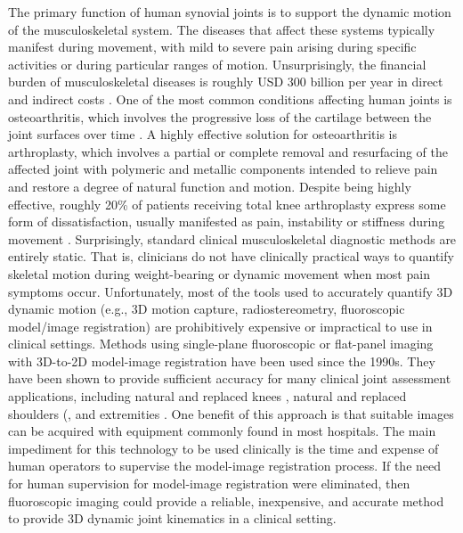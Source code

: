 The primary function of human synovial joints is to support the dynamic motion of the musculoskeletal system. The diseases that affect these systems typically manifest during movement, with mild to severe pain arising during specific activities or during particular ranges of motion. Unsurprisingly, the financial burden of musculoskeletal diseases is roughly USD 300 billion per year in direct and indirect costs \cite{BMUSBurdenMusculoskeletal}. One of the most common conditions affecting human joints is osteoarthritis, which involves the progressive loss of the cartilage between the joint surfaces over time \cite{sharmaOsteoarthritisCompanionRheumatology2007}. A highly effective solution for osteoarthritis is arthroplasty, which involves a partial or complete removal and resurfacing of the affected joint with polymeric and metallic components intended to relieve pain and restore a degree of natural function and motion. Despite being highly effective, roughly 20\% of patients receiving total knee arthroplasty express some form of dissatisfaction, usually manifested as pain, instability or stiffness during movement \cite{bakerRolePainFunction2007,scottPredictingDissatisfactionFollowing2010, bournePatientSatisfactionTotal2010}. Surprisingly, standard clinical musculoskeletal diagnostic methods are entirely static. That is, clinicians do not have clinically practical ways to quantify skeletal motion during weight-bearing or dynamic movement when most pain symptoms occur. Unfortunately, most of the tools used to accurately quantify 3D dynamic motion (e.g., 3D motion capture, radiostereometry, fluoroscopic model/image registration) are prohibitively expensive or impractical to use in clinical settings. Methods using single-plane fluoroscopic or flat-panel imaging with 3D-to-2D model-image registration have been used since the 1990s. They have been shown to provide sufficient accuracy for many clinical  joint assessment applications, including natural and replaced knees \cite{banksAccurateMeasurementThreedimensional1996, banksVivoKinematicsCruciateretaining1997, mahfouzRobustMethodRegistration2003, zuffiModelbasedMethodReconstruction1999}, natural and replaced shoulders (\cite{matsukiVivo3DAnalysis2014, matsukiDynamicVivoGlenohumeral2012, zhuAccuracyRepeatabilityAutomatic2012, matsukiVivo3dimensionalAnalysis2011, kijimaVivo3dimensionalAnalysis2015}, and extremities \cite{yamaguchiAnkleSubtalarKinematics2009, listThreeDimensionalKinematicsUnconstrained2012, cenniFunctionalPerformanceTotal2013, cenniKinematicsThreeComponents2012, tersi3DElbowKinematics2009}. One benefit of this approach is that suitable images can be acquired with equipment commonly found in most hospitals. The main impediment for this technology to be used clinically is the time and expense of human operators to supervise the model-image registration process. If the need for human supervision for model-image registration were eliminated, then fluoroscopic imaging could provide a reliable, inexpensive, and accurate method to provide 3D dynamic joint kinematics in a clinical setting.
